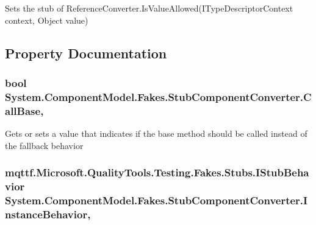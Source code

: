 Sets the stub of Reference\-Converter.\-Is\-Value\-Allowed(\-I\-Type\-Descriptor\-Context context, Object value)



\subsection{Property Documentation}
\hypertarget{class_system_1_1_component_model_1_1_fakes_1_1_stub_component_converter_a132bfe4f2f8dab21d4052cb0171cd5fe}{
\subsubsection[{Call\-Base}]{\setlength{\rightskip}{0pt plus 5cm}bool System.\-Component\-Model.\-Fakes.\-Stub\-Component\-Converter.\-Call\-Base\hspace{0.3cm}{\ttfamily [get]}, {\ttfamily [set]}}}\label{class_system_1_1_component_model_1_1_fakes_1_1_stub_component_converter_a132bfe4f2f8dab21d4052cb0171cd5fe}


Gets or sets a value that indicates if the base method should be called instead of the fallback behavior

\hypertarget{class_system_1_1_component_model_1_1_fakes_1_1_stub_component_converter_a145c9e95c3161464161dcef8f513112c}{
\subsubsection[{Instance\-Behavior}]{\setlength{\rightskip}{0pt plus 5cm}mqttf.\-Microsoft.\-Quality\-Tools.\-Testing.\-Fakes.\-Stubs.\-I\-Stub\-Behavior System.\-Component\-Model.\-Fakes.\-Stub\-Component\-Converter.\-Instance\-Behavior\hspace{0.3cm}{\ttfamily [get]}, {\ttfamily [set]}}}\label{class_system_1_1_component_model_1_1_fakes_1_1_stub_component_converter_a145c9e95c3161464161dcef8f513112c}


